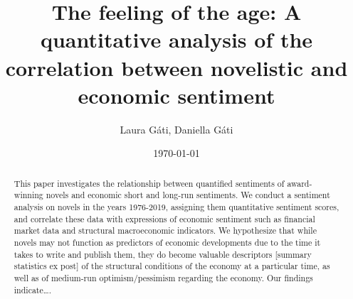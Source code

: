 \documentclass{article}
\title{The feeling of the age: A quantitative analysis of the correlation between novelistic and economic sentiment}
\author{Laura G\'ati, Daniella G\'ati}
\date{\today}
\begin{document}
\maketitle

\begin{abstract}
	This paper investigates the relationship between quantified sentiments of award-winning novels and economic short and long-run sentiments. We conduct a sentiment analysis on novels in the years 1976-2019, assigning them quantitative sentiment scores, and correlate these data with expressions of economic sentiment such as financial market data and structural macroeconomic indicators. We hypothesize that while novels may not function as predictors of economic developments due to the time it takes to write and publish them, they do become valuable descriptors [summary statistics ex post] of the structural conditions of the economy at a particular time, as well as of medium-run optimism/pessimism regarding the economy. Our findings indicate….
\end{abstract}

\end{document}

